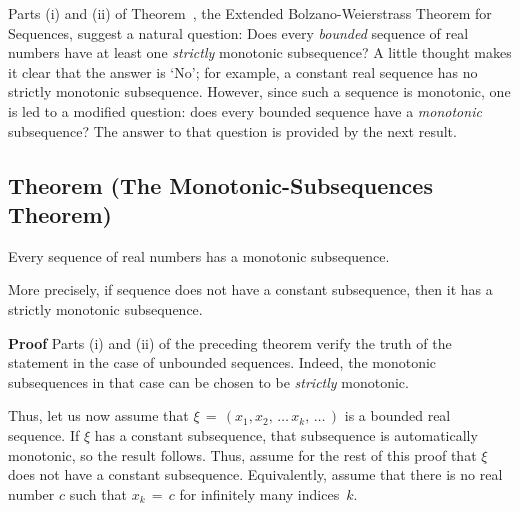 \VV

        Parts (i) and (ii) of Theorem~, the Extended Bolzano-Weierstrass Theorem for Sequences, suggest a natural question:
    Does every {\em bounded} sequence of real numbers have at least one {\em strictly} monotonic subsequence?
    A little thought makes it clear that the answer is `No'; for example, a constant real sequence has no strictly monotonic subsequence.
    However, since such a sequence is monotonic, one is led to a modified question: does every bounded sequence have a {\em monotonic} subsequence?
    The answer to that question is provided by the next result.

\V

            \subsection{\small{\bf Theorem} (The Monotonic-Subsequences Theorem)}
            \label{ThmC30.15}

\V

        Every sequence of real numbers has a monotonic subsequence.

        More precisely, if sequence does not have a constant subsequence, then it has a strictly monotonic subsequence.

\V

        {\bf Proof} Parts (i) and (ii) of the preceding theorem verify the truth of the statement in the case of unbounded sequences.
    Indeed, the monotonic subsequences in that case can be chosen to be {\em strictly} monotonic.

        Thus, let us now assume that ${\xi} \,=\, (x_{1}, x_{2},\,{\ldots}\,x_{k},\,{\ldots}\,)$ is a bounded real sequence.
    If ${\xi}$ has a constant subsequence, that subsequence is automatically monotonic, so the result follows.
    Thus, assume for the rest of this proof that ${\xi}$ does not have a constant subsequence.
    Equivalently, assume that there is no real number $c$ such that $x_{k} \,=\, c$ for infinitely many indices~$k$.

\V

